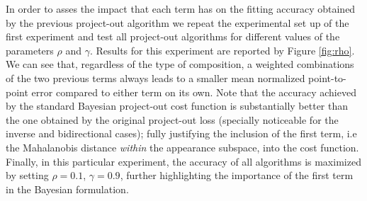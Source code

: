 In order to asses the impact that each term has on the fitting accuracy obtained by the previous project-out algorithm we repeat the experimental set up of the first experiment and test all project-out algorithms for different values of the parameters $\rho$ and $\gamma$. Results for this experiment are reported by Figure \ref{fig:rho}. We can see that, regardless of the type of composition, a weighted combinations of the two previous terms always leads to a smaller mean normalized point-to-point error compared to either term on its own. Note that the accuracy achieved by the standard Bayesian project-out cost function is substantially better than the one obtained by the original project-out loss (specially noticeable for the inverse and bidirectional cases); fully justifying the inclusion of the first term, i.e the Mahalanobis distance \emph{within} the appearance subspace, into the cost function. Finally, in this particular experiment, the accuracy of all algorithms is maximized by setting $\rho=0.1$, $\gamma=0.9$, further highlighting the importance of the first term in the Bayesian formulation.

